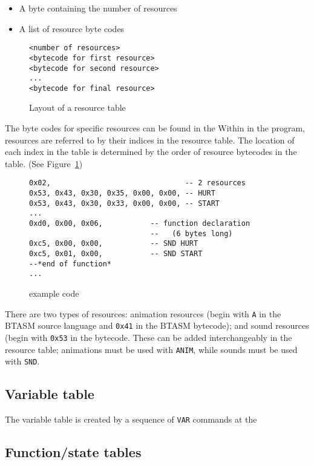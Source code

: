 \documentclass[12pt,a4paper]{scrbook}
\begin{document}
\begin{itemize}
\item A byte containing the number of resources
\item A list of resource byte codes
\end{itemize}
\begin{figure}[h]
\begin{lstlisting}
<number of resources>
<bytecode for first resource>
<bytecode for second resource>
...
<bytecode for final resource>
\end{lstlisting}
\caption{Layout of a resource table} 
\end{figure}

The byte codes for specific resources can be found in the 
Within in the program, resources are referred to by their indices in the resource table.  The
location of each index in the table is determined by the order of resource bytecodes in the
table.  (See Figure~\ref{Resource table})
\begin{figure}[h]
\begin{lstlisting}
0x02,								-- 2 resources
0x53, 0x43, 0x30, 0x35, 0x00, 0x00, -- HURT
0x53, 0x43, 0x30, 0x33, 0x00, 0x00,	-- START
...
0xd0, 0x00, 0x06, 			-- function declaration 
							--   (6 bytes long)
0xc5, 0x00, 0x00,			-- SND HURT
0xc5, 0x01, 0x00,			-- SND START
--*end of function*
...
\end{lstlisting}
\caption{\label{Resource table} example code} 
\end{figure}

There are two types of resources: animation resources (begin with \texttt{A} in the BTASM source
language and \texttt{0x41} in the BTASM bytecode); and sound resources (begin with \texttt{0x53}
in the bytecode.  These can be added interchangeably in the resource table; animations must be
used with \texttt{ANIM}, while sounds must be used with \texttt{SND}.


\subsection{Variable table}
\label{sec:vartable}
The variable table is created by a sequence of \texttt{VAR} commands at the 

\subsection{Function/state tables}
\label{sec:funstatetables}
\end{document}
